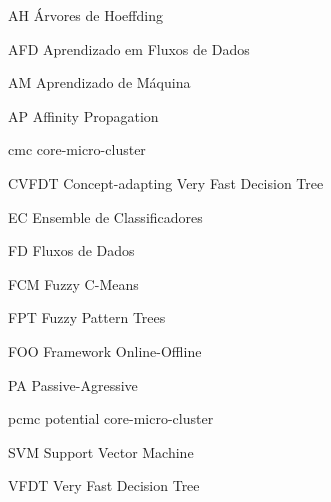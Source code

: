 \begin{siglas}
   \item[AH] Árvores de Hoeffding
   \item[AFD] Aprendizado em Fluxos de Dados
   \item[AM] Aprendizado de Máquina
   \item[AP] Affinity Propagation
   \item[cmc] core-micro-cluster
   \item[CVFDT] Concept-adapting Very Fast Decision Tree
   \item[EC] Ensemble de Classificadores
   \item[FD] Fluxos de Dados
   \item[FCM] Fuzzy C-Means
   \item[FPT] Fuzzy Pattern Trees
   \item[FOO] Framework Online-Offline
   \item[PA] Passive-Agressive
   \item[pcmc] potential core-micro-cluster
   \item[SVM] Support Vector Machine
   \item[VFDT] Very Fast Decision Tree
\end{siglas}